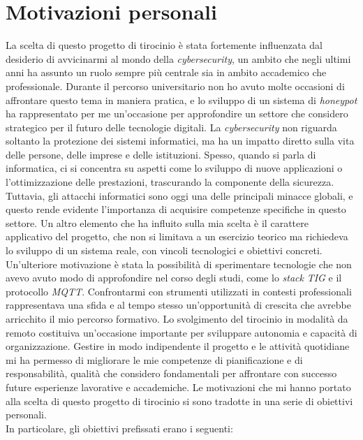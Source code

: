 \section{Motivazioni personali}
La scelta di questo progetto di tirocinio è stata fortemente influenzata dal desiderio di avvicinarmi al mondo della \textit{cybersecurity}, un ambito che negli ultimi anni ha assunto un ruolo sempre più centrale sia in ambito accademico che professionale. Durante il percorso universitario non ho avuto molte occasioni di affrontare questo tema in maniera pratica, e lo sviluppo di un sistema di \textit{honeypot} ha rappresentato per me un'occasione per approfondire un settore che considero strategico per il futuro delle tecnologie digitali.
La \textit{cybersecurity} non riguarda soltanto la protezione dei sistemi informatici, ma ha un impatto diretto sulla vita delle persone, delle imprese e delle istituzioni. Spesso, quando si parla di informatica, ci si concentra su aspetti come lo sviluppo di nuove applicazioni o l'ottimizzazione delle prestazioni, trascurando la componente della sicurezza. Tuttavia, gli attacchi informatici sono oggi una delle principali minacce globali, e questo rende evidente l'importanza di acquisire competenze specifiche in questo settore.  
Un altro elemento che ha influito sulla mia scelta è il carattere applicativo del progetto, che non si limitava a un esercizio teorico ma richiedeva lo sviluppo di un sistema reale, con vincoli tecnologici e obiettivi concreti. 
Un'ulteriore motivazione è stata la possibilità di sperimentare tecnologie che non avevo avuto modo di approfondire nel corso degli studi, come lo \textit{stack} \textit{TIG} e il protocollo \textit{MQTT}. Confrontarmi con strumenti utilizzati in contesti professionali rappresentava una sfida e al tempo stesso un'opportunità di crescita che avrebbe arricchito il mio percorso formativo.  
Lo svolgimento del tirocinio in modalità da remoto costituiva un'occasione importante per sviluppare autonomia e capacità di organizzazione. Gestire in modo indipendente il progetto e le attività quotidiane mi ha permesso di migliorare le mie competenze di pianificazione e di responsabilità, qualità che considero fondamentali per affrontare con successo future esperienze lavorative e accademiche.  
Le motivazioni che mi hanno portato alla scelta di questo progetto di tirocinio si sono tradotte in una serie di obiettivi personali.\\
In particolare, gli obiettivi prefissati erano i seguenti:
